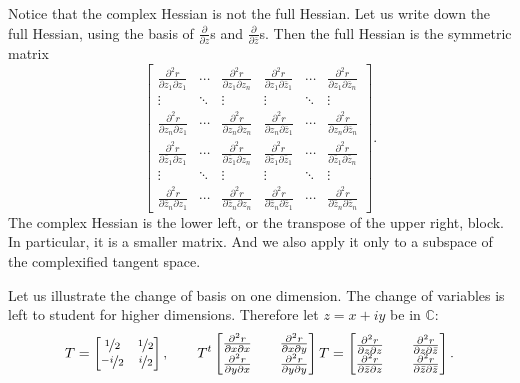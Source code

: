 \documentclass[12pt,openany]{book}
\newcommand{\C}{{\mathbb{C}}}
\theoremstyle{plain}
\theoremstyle{remark}
\theoremstyle{definition}
\theoremstyle{exercise}
\theoremstyle{example}
\begin{document}
Notice that the complex Hessian is not the full Hessian.
Let us write down the full Hessian, using the
basis of $\frac{\partial}{\partial z}$s and
$\frac{\partial}{\partial \bar{z}}$s.  Then the
full 
Hessian is the symmetric matrix
\begin{equation*}
\begin{bmatrix}
\frac{\partial^2 r}{\partial z_1 \partial z_1}
& \cdots &
\frac{\partial^2 r}{\partial z_1 \partial z_n}
&
\frac{\partial^2 r}{\partial z_1 \partial \bar{z}_1} 
& \cdots &
\frac{\partial^2 r}{\partial z_1 \partial \bar{z}_n} 
\\
\vdots & \ddots & \vdots & \vdots & \ddots & \vdots
\\
\frac{\partial^2 r}{\partial z_n \partial z_1}
& \cdots &
\frac{\partial^2 r}{\partial z_n \partial z_n}
&
\frac{\partial^2 r}{\partial z_n \partial \bar{z}_1} 
& \cdots &
\frac{\partial^2 r}{\partial z_n \partial \bar{z}_n} 
\\
\frac{\partial^2 r}{\partial \bar{z}_1 \partial z_1}
& \cdots &
\frac{\partial^2 r}{\partial \bar{z}_1 \partial z_n}
&
\frac{\partial^2 r}{\partial \bar{z}_1 \partial \bar{z}_1} 
& \cdots &
\frac{\partial^2 r}{\partial \bar{z}_1 \partial \bar{z}_n} 
\\
\vdots & \ddots & \vdots & \vdots & \ddots & \vdots
\\
\frac{\partial^2 r}{\partial \bar{z}_n \partial z_1}
& \cdots &
\frac{\partial^2 r}{\partial \bar{z}_n \partial z_n}
&
\frac{\partial^2 r}{\partial \bar{z}_n \partial \bar{z}_1} 
& \cdots &
\frac{\partial^2 r}{\partial \bar{z}_n \partial \bar{z}_n} 
\end{bmatrix}
.
\end{equation*}
The complex Hessian is the lower left,
or the transpose of the upper right, block.  In
particular, it is a smaller matrix. And we also apply it only to a subspace 
of the complexified tangent space.

Let us illustrate the change of basis on one dimension.  The change of
variables is left to student for higher dimensions.  Therefore let $z =
x+iy$ be in $\C$:
\begin{equation*}
T = 
\begin{bmatrix}
\nicefrac{1}{2} & \nicefrac{1}{2} \\
\nicefrac{-i}{2} & \nicefrac{i}{2}
\end{bmatrix}
,
\qquad
T^t
\begin{bmatrix}
\frac{\partial^2 r}{\partial x \partial x} &&
\frac{\partial^2 r}{\partial x \partial y}
\\
\frac{\partial^2 r}{\partial y \partial x} &&
\frac{\partial^2 r}{\partial y \partial y}
\end{bmatrix}
T
=
\begin{bmatrix}
\frac{\partial^2 r}{\partial z \partial z} &&
\frac{\partial^2 r}{\partial z \partial \bar{z}}
\\
\frac{\partial^2 r}{\partial \bar{z} \partial z} &&
\frac{\partial^2 r}{\partial \bar{z} \partial \bar{z}}
\end{bmatrix}
.
\end{equation*}
\end{document}
